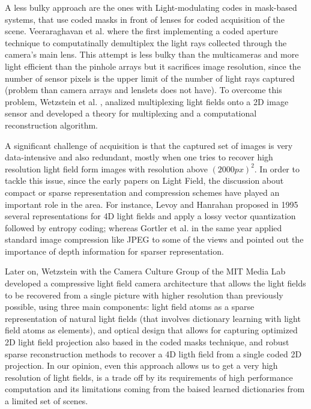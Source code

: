 \bigskip

A less bulky approach are the ones with Light-modulating codes in mask-based systems, that use coded masks in front of lenses for coded acquisition of the scene. Veeraraghavan et al. \cite{Veeraraghavan} where the first implementing a coded aperture technique to computatinally demultiplex the light rays collected through the camera's main lens. This attempt is less bulky than the multicameras and more light efficient than the pinhole arrays but it sacrifices image resolution, since the number of sensor pixels is the upper limit of the number of light rays captured (problem than camera arrays and lenslets does not have). To overcome this problem, Wetzstein et al. \cite{Wetzstein}, analized multiplexing light fields onto a 2D image sensor and developed a theory for multiplexing and a computational reconstruction algorithm. 

\bigskip

A significant challenge of acquisition is that the captured set of images is very data-intensive and also redundant, mostly when one tries to recover high resolution light field form images with resolution above $(2000px)^2$. In order to tackle this issue, since the early papers on Light Field, the discussion about compact or sparse representation and compression schemes have played an important role in the area. For instance, Levoy and Hanrahan \cite{Levoy} proposed in 1995 several representations for 4D light fields and apply a lossy vector quantization followed by entropy coding; whereas Gortler et al. \cite{Gortler} in the same year applied standard image compression like JPEG to some of the views and pointed out the importance of depth information for sparser representation.

\bigskip

Later on, Wetzstein with the Camera Culture Group of the MIT Media Lab developed a compressive light field camera architecture that allows the light fields to be recovered from a single picture with higher resolution than previously possible, using three main components: light field atoms as a sparse representation of natural light fields (that involves dictionary learning with light field atoms as elements), and optical design that allows for capturing optimized 2D light field projection also based in the coded masks technique, and robust sparse reconstruction methods to recover a 4D ligth field from a single coded 2D projection. In our opinion, even this approach allows us to get a very high resolution of light fields, is a trade off by its requirements of high performance computation and its limitations coming from the baised learned dictionaries from a limited set of scenes. 


